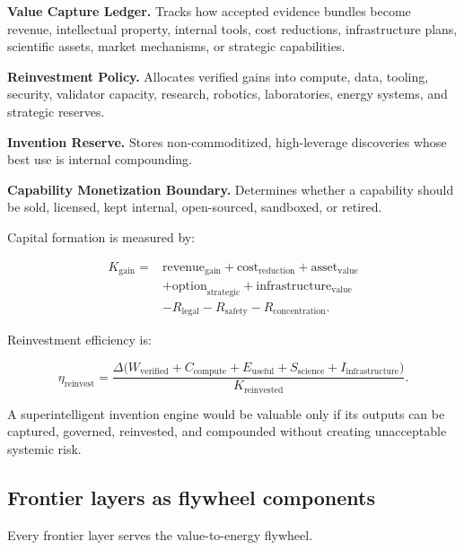 \textbf{Value Capture Ledger.} Tracks how accepted evidence bundles
become revenue, intellectual property, internal tools, cost reductions,
infrastructure plans, scientific assets, market mechanisms, or strategic
capabilities.

\textbf{Reinvestment Policy.} Allocates verified gains into compute,
data, tooling, security, validator capacity, research, robotics,
laboratories, energy systems, and strategic reserves.

\textbf{Invention Reserve.} Stores non-commoditized, high-leverage
discoveries whose best use is internal compounding.

\textbf{Capability Monetization Boundary.} Determines whether a
capability should be sold, licensed, kept internal, open-sourced,
sandboxed, or retired.

Capital formation is measured by:

\[
\begin{aligned}
K_{\mathrm{gain}}={}&
\mathrm{revenue}_{\mathrm{gain}}
+\mathrm{cost}_{\mathrm{reduction}}
+\mathrm{asset}_{\mathrm{value}} \\
&+\mathrm{option}_{\mathrm{strategic}}
+\mathrm{infrastructure}_{\mathrm{value}} \\
&-R_{\mathrm{legal}}-R_{\mathrm{safety}}-R_{\mathrm{concentration}}.
\end{aligned}
\]

Reinvestment efficiency is:

\[
\eta_{\mathrm{reinvest}}
=
\frac{
\Delta\!\big(W_{\mathrm{verified}}+C_{\mathrm{compute}}+E_{\mathrm{useful}}
+S_{\mathrm{science}}+I_{\mathrm{infrastructure}}\big)
}{K_{\mathrm{reinvested}}}.
\]

A superintelligent invention engine would be valuable only if its
outputs can be captured, governed, reinvested, and compounded without
creating unacceptable systemic risk.

\subsection{Frontier layers as flywheel
components}\label{frontier-layers-as-flywheel-components}

Every frontier layer serves the value-to-energy flywheel.

